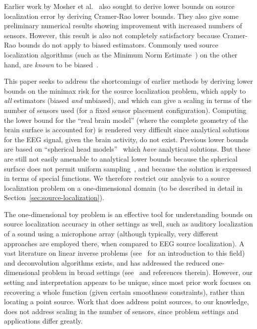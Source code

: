 \documentclass[conference]{IEEEtran}
\begin{document}
Earlier work by Mosher et al.~\cite{Mosher1993Error} also sought to derive
lower bounds on source localization error by deriving Cramer-Rao lower bounds.
They also give some preliminary numerical results showing improvement with
increased numbers of sensors. However, this result is also not completely
satisfactory because Cramer-Rao bounds do not apply to biased estimators.
Commonly used source localization algorithms (such as the Minimum Norm
Estimate~\cite{Hamalainen1994Interpreting}) on the other hand, are \emph{known}
to be biased~\cite{Lin2006Assessing}.

This paper seeks to address the shortcomings of earlier methods by deriving
lower bounds on the minimax risk for the source localization problem, which
apply to \emph{all} estimators (biased \emph{and} unbiased), and which can give
a scaling in terms of the number of sensors used (for a fixed sensor placement
configuration). Computing the lower bound for the ``real brain model'' (where
the complete geometry of the brain surface is accounted for) is rendered very
difficult since analytical solutions for the EEG signal, given the brain
activity, do not exist. Previous lower bounds are based on ``spherical head
models''~\cite{Nunez2006Electric,Grover2016Information} which \emph{have}
analytical solutions. But these are still not easily amenable to analytical
lower bounds because the spherical surface does not permit uniform
sampling~\cite{Heath1956Thirteen}, and because the solution is expressed in
terms of special functions. We therefore restrict our analysis to a source
localization problem on a one-dimensional domain (to be described in detail in
Section~\ref{sec:source-localization}).

The one-dimensional toy problem is an effective tool for understanding bounds
on source localization accuracy in other settings as well, such as auditory
localization of a sound using a microphone array (although typically, very
different approaches are employed there, when compared to EEG source
localization). A vast literature on linear inverse problems
(see~\cite{Bal2012Introduction} for an introduction to this field) and
deconvolution algorithms exists, and has addressed the reduced one-dimensional
problem in broad settings
(see~\cite{Cavalier2002Sharp,Efromovich1997Robust,Ibragimov1981Statistical} and
references therein). However, our setting and interpretation appears to be
unique, since most prior work focuses on recovering a whole function (given
certain smoothness constraints), rather than locating a point source. Work that
does address point sources, to our knowledge, does not address scaling in the
number of sensors, since problem settings and applications differ greatly.
\end{document}
